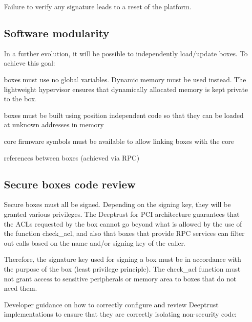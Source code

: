 Failure to verify any signature leads to a reset of the platform.\hypertarget{_p_c_i_g_u_i_d_a_n_c_e_sub_fwmod}{}\subsection{Software modularity}\label{_p_c_i_g_u_i_d_a_n_c_e_sub_fwmod}
In a further evolution, it will be possible to independently load/update boxes. To achieve this goal\+:
\begin{DoxyItemize}
\item boxes must use no global variables. Dynamic memory must be used instead. The lightweight hypervisor ensures that dynamically allocated memory is kept private to the box.
\item boxes must be built using position independent code so that they can be loaded at unknown addresses in memory
\item core firmware symbols must be available to allow linking boxes with the core
\item references between boxes (achieved via R\+PC)
\end{DoxyItemize}\hypertarget{_p_c_i_g_u_i_d_a_n_c_e_sub_boxrpc}{}\subsection{Secure boxes code review}\label{_p_c_i_g_u_i_d_a_n_c_e_sub_boxrpc}
Secure boxes must all be signed. Depending on the signing key, they will be granted various privileges. The Deeptrust for P\+CI architecture guarantees that the A\+C\+Ls requested by the box cannot go beyond what is allowed by the use of the function check\+\_\+acl, and also that boxes that provide R\+PC services can filter out calls based on the name and/or signing key of the caller.

Therefore, the signature key used for signing a box must be in accordance with the purpose of the box (least privilege principle). The check\+\_\+acl function must not grant access to sensitive peripherals or memory area to boxes that do not need them.

Developer guidance on how to correctly configure and review Deeptrust implementations to ensure that they are correctly isolating non-\/security code\+:

